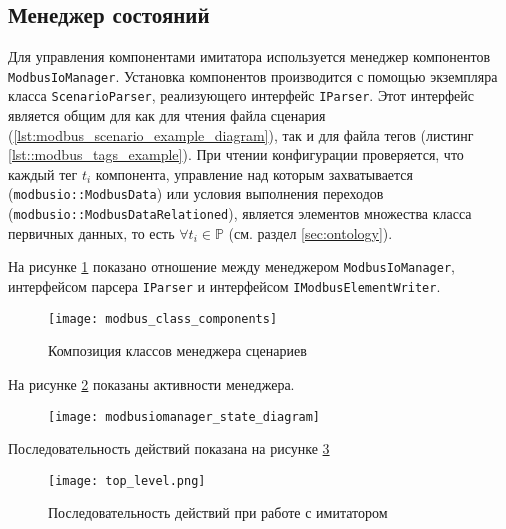 \subsection{Менеджер состояний}
Для управления компонентами имитатора используется менеджер компонентов \texttt{ModbusIoManager}.
Установка компонентов производится с помощью экземпляра класса \texttt{ScenarioParser}, реализующего интерфейс \texttt{IParser}.
Этот интерфейс является общим для как для чтения файла сценария (\ref{lst:modbus_scenario_example_diagram}),
так и для файла тегов (листинг \ref{lst::modbus_tags_example}).
При чтении конфигурации проверяется, что каждый тег $t_i$ компонента,
управление над которым захватывается (\texttt{modbusio::ModbusData}) или условия выполнения переходов (\texttt{modbusio::ModbusDataRelationed}),
является элементов множества класса первичных данных, то есть $\forall t_i \in \mathbb{P}$ (см. раздел \ref{sec:ontology}).

На рисунке \ref{fig:modbus_class_components} показано отношение между менеджером \texttt{ModbusIoManager},
интерфейсом парсера \texttt{IParser} и интерфейсом \texttt{IModbusElementWriter}.
\begin{center}
    \begin{figure}[hb!]
        \texttt{[image: modbus\_class\_components]}
        \caption{Композиция классов менеджера сценариев}\label{fig:modbus_class_components}
    \end{figure}
\end{center}

На рисунке \ref{fig:modbusiomanager_state_diagram} показаны активности менеджера.
\begin{center}
    \begin{figure}
        \texttt{[image: modbusiomanager\_state\_diagram]}
        \caption{}\label{fig:modbusiomanager_state_diagram}
    \end{figure}
\end{center}


Последовательность действий показана на рисунке \ref{fig:top_level_sequence} \cite[стр. 239]{book:oop:oop_analize}
\begin{center}
    \begin{figure}
        \texttt{[image: top\_level.png]}
        \caption{Последовательность действий при работе с имитатором}\label{fig:top_level_sequence}
    \end{figure}
\end{center}


